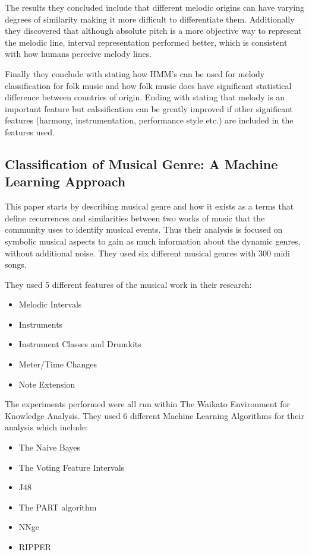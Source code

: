 \documentclass{article}
\begin{document}
	The results they concluded include that different melodic origins can have varying degrees of similarity making it more difficult to differentiate them. Additionally they discovered that although absolute pitch is a more objective way to represent the melodic line, interval representation performed better, which is consistent with how humans perceive melody lines.
	
	Finally they conclude with stating how HMM's can be used for melody classification for folk music and how folk music does have significant statistical difference between countries of origin. Ending with stating that melody is an important feature but calssification can be greatly improved if other significant features (harmony, instrumentation, performance style etc.) are included in the features used.
	 
	\subsection{Classification of Musical Genre: A Machine Learning Approach}
	This paper starts by describing musical genre and how it exists as a terms that define recurrences and similarities between two works of music that the community uses to identify musical events. Thus their analysis is focused on symbolic musical aspects to gain as much information about the dynamic genres, without additional noise. They used six different musical genres with 300 midi songs.
	
	They used 5 different features of the musical work in their research:
	\begin{itemize}
		\item Melodic Intervals
		\item Instruments
		\item Instrument Classes and Drumkits
		\item Meter/Time Changes
		\item Note Extension
	\end{itemize}
	
	The experiments performed were all run within The Waikato Environment for Knowledge Analysis. They used 6 different Machine Learning Algorithms for their analysis which include:
	\begin{itemize}
		\item The Naive Bayes
		\item The Voting Feature Intervals
		\item J48
		\item The PART algorithm
		\item NNge
		\item RIPPER
	\end{itemize}
	
\end{document}
